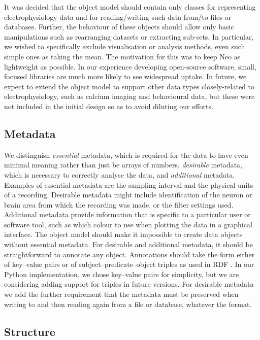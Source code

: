 \documentclass{frontiers}
\begin{document}
It was decided that the object model should contain only classes for representing electrophysiology data and for reading/writing such data from/to files or databases. Further, the behaviour of these objects should allow only basic manipulations such as rearranging datasets or extracting sub-sets. In particular, we wished to specifically exclude visualisation or analysis methods, even such simple ones as taking the mean. The motivation for this was to keep Neo as lightweight as possible. In our experience developing open-source software, small, focused libraries are much more likely to see widespread uptake. In future, we expect to extend the object model to support other data types closely-related to electrophysiology, such as calcium imaging and behavioural data, but these were not included in the initial design so as to avoid diluting our efforts.

\subsection{Metadata}

We distinguish \emph{essential} metadata, which is required for the data to have even minimal meaning rather than just be arrays of numbers, \emph{desirable} metadata, which is necessary to correctly analyse the data, and \emph{additional} metadata.
Examples of essential metadata are the sampling interval and the physical units of a recording.
Desirable metadata might include identification of the neuron or brain area from which the recording was made, or the filter settings used.
Additional metadata provide information that is specific to a particular user or software tool, such as which colour to use when plotting the data in a graphical interface.
The object model should make it impossible to create data objects without essential metadata.
For desirable and additional metadata, it should be straightforward to annotate any object. 
Annotations should take the form either of key--value pairs or of subject--predicate--object triples as used in RDF \citep{RDF-PRIMER}. 
In our Python implementation, we chose key--value pairs for simplicity, but we are considering adding support for triples in future versions.
For desirable metadata we add the further requirement that the metadata must be preserved when writing to and then reading again from a file or database, whatever the format.

\subsection{Structure}
\end{document}
